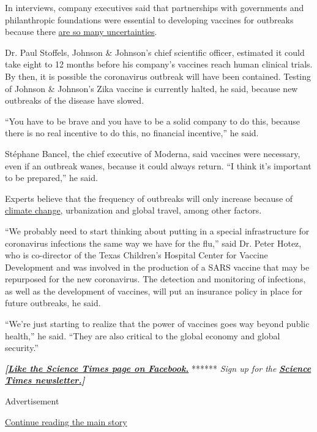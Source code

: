 In interviews, company executives said that partnerships with
governments and philanthropic foundations were essential to developing
vaccines for outbreaks because there
\href{https://www.nytimes3xbfgragh.onion/2014/10/24/health/without-lucrative-market-potential-ebola-vaccine-was-shelved-for-years.html}{are
so many uncertainties}.

Dr. Paul Stoffels, Johnson \& Johnson's chief scientific officer,
estimated it could take eight to 12 months before his company's vaccines
reach human clinical trials. By then, it is possible the coronavirus
outbreak will have been contained. Testing of Johnson \& Johnson's Zika
vaccine is currently halted, he said, because new outbreaks of the
disease have slowed.

``You have to be brave and you have to be a solid company to do this,
because there is no real incentive to do this, no financial incentive,''
he said.

Stéphane Bancel, the chief executive of Moderna, said vaccines were
necessary, even if an outbreak wanes, because it could always return.
``I think it's important to be prepared,'' he said.

Experts believe that the frequency of outbreaks will only increase
because of
\href{https://www.nytimes3xbfgragh.onion/interactive/2019/06/10/climate/dengue-mosquito-spread-map.html}{climate
change}, urbanization and global travel, among other factors.

``We probably need to start thinking about putting in a special
infrastructure for coronavirus infections the same way we have for the
flu,'' said Dr. Peter Hotez, who is co-director of the Texas Children's
Hospital Center for Vaccine Development and was involved in the
production of a SARS vaccine that may be repurposed for the new
coronavirus. The detection and monitoring of infections, as well as the
development of vaccines, will put an insurance policy in place for
future outbreaks, he said.

``We're just starting to realize that the power of vaccines goes way
beyond public health,'' he said. ``They are also critical to the global
economy and global security.''

\textbf{\emph{{[}}\href{http://on.fb.me/1paTQ1h}{\emph{Like the Science
Times page on Facebook.}}} ****** \emph{\textbar{} Sign up for the}
\textbf{\href{http://nyti.ms/1MbHaRU}{\emph{Science Times
newsletter.}}\emph{{]}}}

Advertisement

\protect\hyperlink{after-bottom}{Continue reading the main story}

